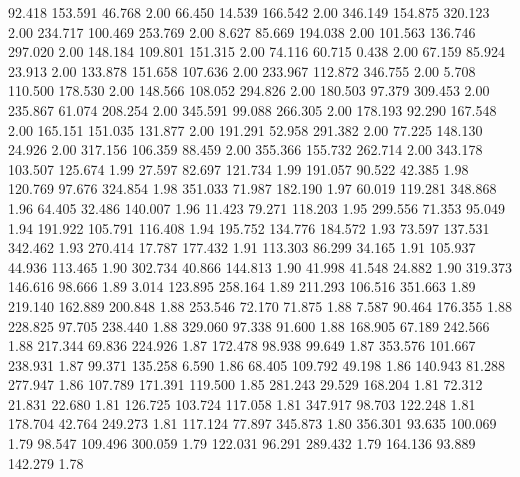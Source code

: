   92.418  153.591   46.768         2.00
  66.450   14.539  166.542         2.00
 346.149  154.875  320.123         2.00
 234.717  100.469  253.769         2.00
   8.627   85.669  194.038         2.00
 101.563  136.746  297.020         2.00
 148.184  109.801  151.315         2.00
  74.116   60.715    0.438         2.00
  67.159   85.924   23.913         2.00
 133.878  151.658  107.636         2.00
 233.967  112.872  346.755         2.00
   5.708  110.500  178.530         2.00
 148.566  108.052  294.826         2.00
 180.503   97.379  309.453         2.00
 235.867   61.074  208.254         2.00
 345.591   99.088  266.305         2.00
 178.193   92.290  167.548         2.00
 165.151  151.035  131.877         2.00
 191.291   52.958  291.382         2.00
  77.225  148.130   24.926         2.00
 317.156  106.359   88.459         2.00
 355.366  155.732  262.714         2.00
 343.178  103.507  125.674         1.99
  27.597   82.697  121.734         1.99
 191.057   90.522   42.385         1.98
 120.769   97.676  324.854         1.98
 351.033   71.987  182.190         1.97
  60.019  119.281  348.868         1.96
  64.405   32.486  140.007         1.96
  11.423   79.271  118.203         1.95
 299.556   71.353   95.049         1.94
 191.922  105.791  116.408         1.94
 195.752  134.776  184.572         1.93
  73.597  137.531  342.462         1.93
 270.414   17.787  177.432         1.91
 113.303   86.299   34.165         1.91
 105.937   44.936  113.465         1.90
 302.734   40.866  144.813         1.90
  41.998   41.548   24.882         1.90
 319.373  146.616   98.666         1.89
   3.014  123.895  258.164         1.89
 211.293  106.516  351.663         1.89
 219.140  162.889  200.848         1.88
 253.546   72.170   71.875         1.88
   7.587   90.464  176.355         1.88
 228.825   97.705  238.440         1.88
 329.060   97.338   91.600         1.88
 168.905   67.189  242.566         1.88
 217.344   69.836  224.926         1.87
 172.478   98.938   99.649         1.87
 353.576  101.667  238.931         1.87
  99.371  135.258    6.590         1.86
  68.405  109.792   49.198         1.86
 140.943   81.288  277.947         1.86
 107.789  171.391  119.500         1.85
 281.243   29.529  168.204         1.81
  72.312   21.831   22.680         1.81
 126.725  103.724  117.058         1.81
 347.917   98.703  122.248         1.81
 178.704   42.764  249.273         1.81
 117.124   77.897  345.873         1.80
 356.301   93.635  100.069         1.79
  98.547  109.496  300.059         1.79
 122.031   96.291  289.432         1.79
 164.136   93.889  142.279         1.78

